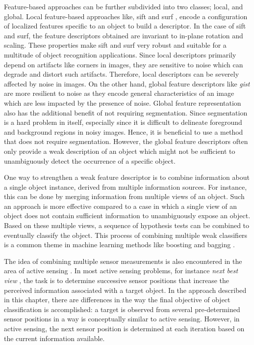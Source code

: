 Feature-based approaches can be further subdivided into two classes; local, and global. Local feature-based approaches like, \gls{sift} \cite{sift} and \gls{surf} \cite{surf}, encode a configuration of localized features specific to an object to build a descriptor. In the case of \gls{sift} and \gls{surf}, the feature descriptors obtained are invariant to in-plane rotation and scaling. These properties make \gls{sift} and \gls{surf} very robust and suitable for a multitude of object recognition applications. Since local descriptors primarily depend on artifacts like corners in images, they are sensitive to noise which can degrade and distort such artifacts. Therefore, local descriptors can be severely affected by noise in images. On the other hand, global feature descriptors like \textit{gist} \cite{gist} are more resilient to noise as they encode general characteristics of an image which are less impacted by the presence of noise. Global feature representation also has the additional benefit of not 
requiring segmentation. Since segmentation is a hard problem in itself, especially since
it is difficult to delineate foreground and background regions in noisy images. Hence, it is beneficial to use a method that does not require segmentation. However, the global feature descriptors often only provide a weak description of an object which might not be sufficient to unambiguously detect the occurrence of a specific object.

One way to strengthen a weak feature descriptor is to combine information about a single object instance, derived from multiple information sources. For instance, this can be done by merging information from multiple views of an object. Such an approach is more effective compared to a case in which a single view of an object does not contain sufficient information to unambiguously expose an object. Based on these multiple views, a sequence of hypothesis tests can be combined to eventually classify the object. This process of combining multiple weak classifiers is a common theme in machine learning methods like boosting and bagging \cite{alpaydin}.

The idea of combining multiple sensor measurements is also encountered in the area of active sensing \cite{chen}. In most active sensing problems, for instance \emph{next best view} \cite{roy,dunn}, the task is to determine successive sensor positions that increase the perceived information  associated with a target object. In the approach described in this chapter, there are differences in the way the final objective of object classification is accomplished: a target is observed from several pre-determined sensor positions in a way is conceptually similar to active sensing. However, in active sensing, the next sensor position is determined at each iteration based on the current information available.


